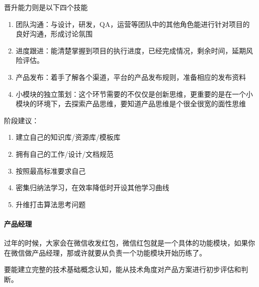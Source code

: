 \documentclass[letterpaper,11pt,english]{sphinxmanual}
\begin{document}
晋升能力则是以下四个技能
\begin{enumerate}
%
\item {} 
团队沟通：与设计，研发，QA，运营等团队中的其他角色能进行针对项目的良好沟通，形成讨论氛围

\item {} 
进度跟进：能清楚掌握到项目的执行进度，已经完成情况，剩余时间，延期风险评估。

\item {} 
产品发布：着手了解各个渠道，平台的产品发布规则，准备相应的发布资料

\item {} 
小模块的独立策划：这个环节需要的不仅仅是创新思维，更重要的是在一个小模块的环境下，去探索产品思维，要知道产品思维是个很全很宽的面性思维

\end{enumerate}

阶段建议：%
\begin{footnote}[601]\sphinxAtStartFootnote
{}
%
\end{footnote}
\begin{enumerate}
%
\item {} 
建立自己的知识库/资源库/模板库

\item {} 
拥有自己的工作/设计/文档规范

\item {} 
按照最高标准要求自己

\item {} 
密集归纳法学习，在效率降低时开设其他学习曲线

\item {} 
升维打击算法思考问题

\end{enumerate}



\paragraph{产品经理}
\label{\detokenize{chapter_experience/career_path:id9}}
过年的时候，大家会在微信收发红包，微信红包就是一个具体的功能模块，如果你在微信做产品经理，那或许就要从负责一个功能模块开始历练了。

要能建立完整的技术基础概念认知，能从技术角度对产品方案进行初步评估和判断。
\end{document}
